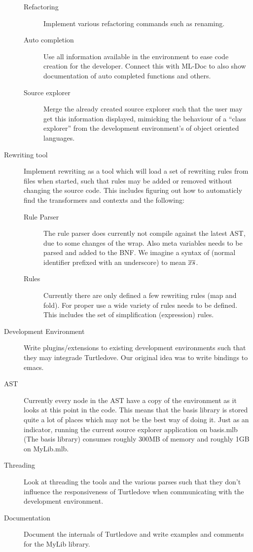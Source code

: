 \begin{description}
\begin{description}
  \item[Refactoring] Implement various refactoring commands such as renaming.

  \item[Auto completion] Use all information available in the environment to
    ease code creation for the developer. Connect this with ML-Doc to also show
    documentation of auto completed functions and others.

  \item[Source explorer] Merge the already created source explorer such that the
    user may get this information displayed, mimicking the behaviour of a ``class
    explorer'' from the development environment's of object oriented languages. 
  \end{description}

\item[Rewriting tool] Implement rewriting as a tool which will load a set of
  rewriting rules from files when started, such that rules may be added or
  removed without changing the source code. This includes figuring out how to
  automaticly find the transformers and contexts and the following:
  \begin{description}
  \item[Rule Parser] The rule parser does currently not compile against the
    latest AST, due to some changes of the wrap. Also meta variables needs to be
    parsed and added to the BNF. We imagine a syntax of  (normal
    identifier prefixed with an underscore) to mean $\overline{xs}$.

  \item[Rules] Currently there are only defined a few rewriting rules (map and
    fold). For proper use a wide variety of rules needs to be defined. This
    includes the set of simplification (expression) rules.
  \end{description}

\item[Development Environment] Write plugins/extensions to existing development
  environments such that they may integrade Turtledove. Our original idea was to
  write bindings to emacs.


\item[AST] Currently every node in the AST have a copy of the environment as it
  looks at this point in the code. This means that the basis library is stored
  quite a lot of places which may not be the best way of doing it. Just as an
  indicator, running the current source explorer application on basis.mlb (The
  basis library) consumes roughly 300MB of memory and roughly 1GB on MyLib.mlb.

\item[Threading] Look at threading the tools and the various parses such that
  they don't influence the responsiveness of Turtledove when communicating with
  the development environment.


\item[Documentation] Document the internals of Turtledove and write examples and
  comments for the MyLib library.

\end{description}

